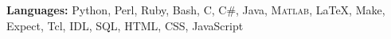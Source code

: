 

\textbf{Languages:} Python, Perl, Ruby, Bash, C, C\#, Java, \textsc{Matlab}, \LaTeX, Make, Expect, Tcl, IDL, SQL, HTML, CSS, JavaScript
